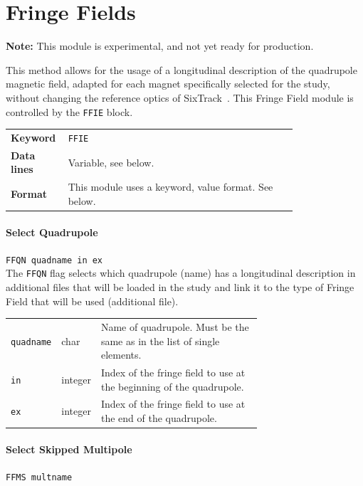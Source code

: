 \section{Fringe Fields} \label{sec:ffield}

\textcolor{notered}{\textbf{Note:} This module is experimental, and not yet ready for production.}

This method allows for the usage of a longitudinal description of the quadrupole magnetic field, adapted for each magnet specifically selected for the study, without changing the reference optics of SixTrack~\cite{ffield:1,ffield:2,ffield:3}.
This Fringe Field module is controlled by the \texttt{FFIE} block.

\bigskip
\begin{tabular}{@{}lp{0.8\linewidth}}
    \textbf{Keyword}    & \texttt{FFIE}\index{FFIE} \\
    \textbf{Data lines} & Variable, see below. \\
    \textbf{Format}     & This module uses a keyword, value format. See below.
\end{tabular}

\bigskip

\paragraph{Select Quadrupole} \texttt{FFQN quadname in ex}\\

The \texttt{FFQN} flag selects which quadrupole (name) has a longitudinal description in additional files that will be loaded in the study and link it to the type of Fringe Field that will be used (additional file).

\bigskip
\begin{tabular}{@{}llp{0.7\linewidth}}
    \texttt{quadname} & char    & Name of quadrupole. Must be the same as in the list of single elements. \\
    \texttt{in}       & integer & Index of the fringe field to use at the beginning of the quadrupole. \\
    \texttt{ex}       & integer & Index of the fringe field to use at the end of the quadrupole.
\end{tabular}

\paragraph{Select Skipped Multipole} \texttt{FFMS multname}\\

